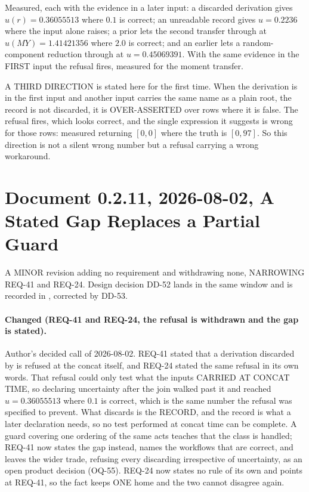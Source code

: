 Measured, each with the evidence in a later input: a discarded
derivation gives $u(r) = 0.36055513$ where $0.1$ is correct; an
unreadable record gives $u = 0.2236$ where the input alone raises; a
prior  lets the second transfer through at
$u(MY) = 1.41421356$ where $2.0$ is correct; and an earlier
 lets a random-component reduction through at
$u = 0.45069391$. With the same evidence in the FIRST input the refusal
fires, measured for the moment transfer.

A THIRD DIRECTION is stated here for the first time. When the derivation
is in the first input and another input carries the same name as a plain
root, the record is not discarded, it is OVER-ASSERTED over rows where
it is false. The refusal fires, which looks correct, and the single
expression it suggests is wrong for those rows: measured
 returning $[0, 0]$ where the truth is $[0, 97]$.
So this direction is not a silent wrong number but a refusal carrying a
wrong workaround.

\section*{Document 0.2.11, 2026-08-02, A Stated Gap Replaces a Partial Guard}

A MINOR revision adding no requirement and withdrawing none, NARROWING
REQ-41 and REQ-24. Design decision DD-52 lands in the same window and is
recorded in , corrected by DD-53.

\paragraph{Changed (REQ-41 and REQ-24, the  refusal is
withdrawn and the gap is stated).} Author's decided call of 2026-08-02.
REQ-41 stated that a derivation discarded by  is refused at
the concat itself, and REQ-24 stated the same refusal in its own words.
That refusal could only test what the inputs CARRIED AT CONCAT TIME, so
declaring uncertainty after the join walked past it and reached
$u = 0.36055513$ where $0.1$ is correct, which is the same number the
refusal was specified to prevent. What  discards is the
RECORD, and the record is what a later declaration needs, so no test
performed at concat time can be complete. A guard covering one ordering of
the same acts teaches that the class is handled; REQ-41 now states the
gap instead, names the workflows that are correct, and leaves the wider
trade, refusing every discarding  irrespective of
uncertainty, as an open product decision (OQ-55). REQ-24 now states no
rule of its own and points at REQ-41, so the fact keeps ONE home and the
two cannot disagree again.

